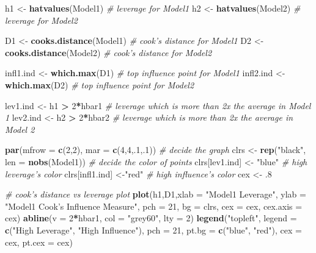 \documentclass[]{article}
\newenvironment{Shaded}{\begin{snugshade}}{\end{snugshade}}
\newcommand{\KeywordTok}[1]{\textcolor[rgb]{0.13,0.29,0.53}{\textbf{#1}}}
\newcommand{\DataTypeTok}[1]{\textcolor[rgb]{0.13,0.29,0.53}{#1}}
\newcommand{\DecValTok}[1]{\textcolor[rgb]{0.00,0.00,0.81}{#1}}
\newcommand{\StringTok}[1]{\textcolor[rgb]{0.31,0.60,0.02}{#1}}
\newcommand{\CommentTok}[1]{\textcolor[rgb]{0.56,0.35,0.01}{\textit{#1}}}
\newcommand{\OperatorTok}[1]{\textcolor[rgb]{0.81,0.36,0.00}{\textbf{#1}}}
\newcommand{\NormalTok}[1]{#1}
\begin{document}
\begin{Shaded}
\begin{Highlighting}[]
\NormalTok{h1 <-}\StringTok{ }\KeywordTok{hatvalues}\NormalTok{(Model1) }\CommentTok{# leverage for Model1}
\NormalTok{h2 <-}\StringTok{ }\KeywordTok{hatvalues}\NormalTok{(Model2) }\CommentTok{# leverage for Model2}

\NormalTok{D1 <-}\StringTok{ }\KeywordTok{cooks.distance}\NormalTok{(Model1) }\CommentTok{# cook's distance for Model1 }
\NormalTok{D2 <-}\StringTok{ }\KeywordTok{cooks.distance}\NormalTok{(Model2) }\CommentTok{# cook's distance for Model2}

\NormalTok{infl1.ind <-}\StringTok{ }\KeywordTok{which.max}\NormalTok{(D1) }\CommentTok{# top influence point for Model1 }
\NormalTok{infl2.ind <-}\StringTok{ }\KeywordTok{which.max}\NormalTok{(D2) }\CommentTok{# top influence point for Model2}

\NormalTok{lev1.ind <-}\StringTok{ }\NormalTok{h1 }\OperatorTok{>}\StringTok{ }\DecValTok{2}\OperatorTok{*}\NormalTok{hbar1 }\CommentTok{# leverage which is more than 2x the average in Model 1 }
\NormalTok{lev2.ind <-}\StringTok{ }\NormalTok{h2 }\OperatorTok{>}\StringTok{ }\DecValTok{2}\OperatorTok{*}\NormalTok{hbar2 }\CommentTok{# leverage which is more than 2x the average in Model 2}

\KeywordTok{par}\NormalTok{(}\DataTypeTok{mfrow =} \KeywordTok{c}\NormalTok{(}\DecValTok{2}\NormalTok{,}\DecValTok{2}\NormalTok{), }\DataTypeTok{mar =} \KeywordTok{c}\NormalTok{(}\DecValTok{4}\NormalTok{,}\DecValTok{4}\NormalTok{,.}\DecValTok{1}\NormalTok{,.}\DecValTok{1}\NormalTok{)) }\CommentTok{# decide the graph}
\NormalTok{clrs <-}\StringTok{ }\KeywordTok{rep}\NormalTok{(}\StringTok{"black"}\NormalTok{, }\DataTypeTok{len =} \KeywordTok{nobs}\NormalTok{(Model1)) }\CommentTok{# decide the color of points }
\NormalTok{clrs[lev1.ind] <-}\StringTok{ "blue"} \CommentTok{# high leverage's color}
\NormalTok{clrs[infl1.ind] <-}\StringTok{"red"} \CommentTok{# high influence's color}
\NormalTok{cex <-}\StringTok{ }\NormalTok{.}\DecValTok{8}

\CommentTok{# cook's distance vs leverage plot}
\KeywordTok{plot}\NormalTok{(h1,D1,}\DataTypeTok{xlab =} \StringTok{"Model1 Leverage"}\NormalTok{,}
     \DataTypeTok{ylab =} \StringTok{"Model1 Cook's Influence Measure"}\NormalTok{,}
     \DataTypeTok{pch =} \DecValTok{21}\NormalTok{, }\DataTypeTok{bg =}\NormalTok{ clrs, }\DataTypeTok{cex =}\NormalTok{ cex, }\DataTypeTok{cex.axis =}\NormalTok{ cex)}
\KeywordTok{abline}\NormalTok{(}\DataTypeTok{v =} \DecValTok{2}\OperatorTok{*}\NormalTok{hbar1, }\DataTypeTok{col =} \StringTok{"grey60"}\NormalTok{, }\DataTypeTok{lty =} \DecValTok{2}\NormalTok{)}
\KeywordTok{legend}\NormalTok{(}\StringTok{"topleft"}\NormalTok{, }\DataTypeTok{legend =} \KeywordTok{c}\NormalTok{(}\StringTok{"High Leverage"}\NormalTok{, }\StringTok{"High Influence"}\NormalTok{),}
       \DataTypeTok{pch =} \DecValTok{21}\NormalTok{, }\DataTypeTok{pt.bg =} \KeywordTok{c}\NormalTok{(}\StringTok{"blue"}\NormalTok{, }\StringTok{"red"}\NormalTok{),}
       \DataTypeTok{cex =}\NormalTok{ cex, }\DataTypeTok{pt.cex =}\NormalTok{ cex)}


\end{Highlighting}
\end{Shaded}
\end{document}
